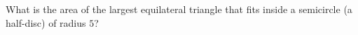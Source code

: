 What is the area of the largest equilateral triangle that fits inside a semicircle (a half-disc) of radius $5$?
